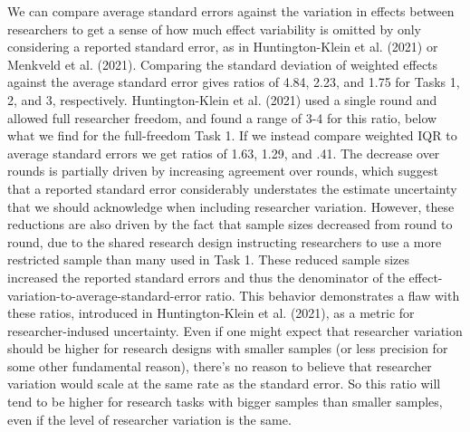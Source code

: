 \documentclass[
  letterpaper,
  DIV=11,
  numbers=noendperiod]{scrartcl}
\begin{document}
We can compare average standard errors against the variation in effects
between researchers to get a sense of how much effect variability is
omitted by only considering a reported standard error, as in
Huntington-Klein et al. (2021) or Menkveld et al. (2021). Comparing the
standard deviation of weighted effects against the average standard
error gives ratios of 4.84, 2.23, and 1.75 for Tasks 1, 2, and 3,
respectively. Huntington-Klein et al. (2021) used a single round and
allowed full researcher freedom, and found a range of 3-4 for this
ratio, below what we find for the full-freedom Task 1. If we instead
compare weighted IQR to average standard errors we get ratios of 1.63,
1.29, and .41. The decrease over rounds is partially driven by
increasing agreement over rounds, which suggest that a reported standard
error considerably understates the estimate uncertainty that we should
acknowledge when including researcher variation. However, these
reductions are also driven by the fact that sample sizes decreased from
round to round, due to the shared research design instructing
researchers to use a more restricted sample than many used in Task 1.
These reduced sample sizes increased the reported standard errors and
thus the denominator of the effect-variation-to-average-standard-error
ratio. This behavior demonstrates a flaw with these ratios, introduced
in Huntington-Klein et al. (2021), as a metric for researcher-indused
uncertainty. Even if one might expect that researcher variation should
be higher for research designs with smaller samples (or less precision
for some other fundamental reason), there's no reason to believe that
researcher variation would scale at the same rate as the standard error.
So this ratio will tend to be higher for research tasks with bigger
samples than smaller samples, even if the level of researcher variation
is the same.
\end{document}
